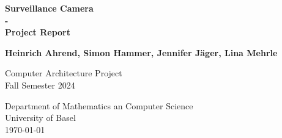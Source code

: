 \begin{titlepage}
    \begin{center}
        \vspace*{1cm}
            
        \Huge
        \textbf{Surveillance Camera\\ - \\Project Report}
            
        \vspace{0.8cm}
        \LARGE
            
        \textbf{Heinrich Ahrend, Simon Hammer, Jennifer Jäger, Lina Mehrle}
            

        \vfill
            
        Computer Architecture Project\\
        Fall Semester 2024
        
            
        \vspace{0.8cm}
        \vspace{0.8cm}
            
        \Large
        Department of Mathematics an Computer Science\\
        University of Basel\\
        \today
            
    \end{center}
\end{titlepage}